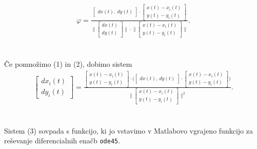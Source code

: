 \documentclass[a4paper,12pt]{article}
\begin{document}
\begin{align}
    \varphi = 
    \frac{
    \begin{bmatrix} 
        dx(t), \ %
        dy(t)
    \end{bmatrix}
    \cdot
    \begin{bmatrix} 
        x(t) - x_i(t) \\
        y(t) - y_i(t)
    \end{bmatrix}
    }
    {
    \Big \|
    \begin{bmatrix} 
        dx(t) \\
        dy(t)
    \end{bmatrix}
    \Big \| 
    \cdot
    \Big \|
    \begin{bmatrix} 
        x(t) - x_i(t) \\
        y(t) - y_i(t)
    \end{bmatrix}
    \Big \| 
    }
    .
\end{align}
\\
\\
Če pomnožimo (1) in (2), dobimo sistem \\
\begin{align}
    \begin{bmatrix} 
        dx_i(t) \\
        dy_i(t) 
    \end{bmatrix}
    =
    \frac{
    \begin{bmatrix} 
        x(t) - x_i(t) \\
        y(t) - y_i(t)
    \end{bmatrix}
    \cdot
    \Big(
    \begin{bmatrix} 
        dx(t), \ %
        dy(t)
    \end{bmatrix}
    \cdot
    \begin{bmatrix} 
        x(t) - x_i(t) \\
        y(t) - y_i(t)
    \end{bmatrix}
    \Big)
    }
    {
    \Big \|
    \begin{bmatrix} 
        x(t) - x_i(t) \\
        y(t) - y_i(t)
    \end{bmatrix}
    \Big \| ^ {2}
    }
    .
\end{align}
\\
\\
Sistem (3) sovpada s funkcijo, ki jo vstavimo v Matlabovo vgrajeno funkcijo za reševanje diferencialnih enačb 
{\texttt{ode45}}.
\\
\\
\end{document}
